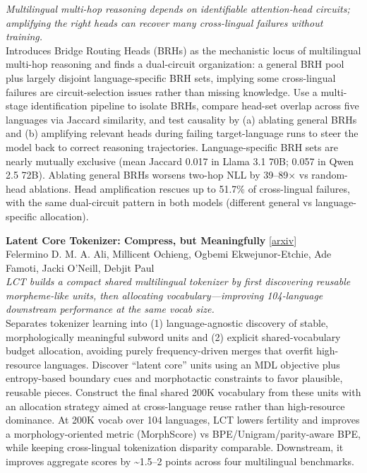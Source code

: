 \documentclass[12pt,letterpaper]{article}
\begin{document}
{\small\textit{Multilingual multi-hop reasoning depends on identifiable attention-head circuits; amplifying the right heads can recover many cross-lingual failures without training.}}\\[1pt]
{\footnotesize Introduces Bridge Routing Heads (BRHs) as the mechanistic locus of multilingual multi-hop reasoning and finds a dual-circuit organization: a general BRH pool plus largely disjoint language-specific BRH sets, implying some cross-lingual failures are circuit-selection issues rather than missing knowledge. Use a multi-stage identification pipeline to isolate BRHs, compare head-set overlap across five languages via Jaccard similarity, and test causality by (a) ablating general BRHs and (b) amplifying relevant heads during failing target-language runs to steer the model back to correct reasoning trajectories. Language-specific BRH sets are nearly mutually exclusive (mean Jaccard 0.017 in Llama 3.1 70B; 0.057 in Qwen 2.5 72B). Ablating general BRHs worsens two-hop NLL by 39--89× vs random-head ablations. Head amplification rescues up to 51.7\% of cross-lingual failures, with the same dual-circuit pattern in both models (different general vs language-specific allocation).}

\medskip

{\small\textbf{Latent Core Tokenizer: Compress, but Meaningfully}} {\scriptsize[\href{https://arxiv.org/abs/2610.12376}{arxiv}]}\\
{\scriptsize Felermino D. M. A. Ali, Millicent Ochieng, Ogbemi Ekwejunor-Etchie, Ade Famoti, Jacki O'Neill, Debjit Paul}\\

{\small\textit{LCT builds a compact shared multilingual tokenizer by first discovering reusable morpheme-like units, then allocating vocabulary---improving 104-language downstream performance at the same vocab size.}}\\[1pt]
{\footnotesize Separates tokenizer learning into (1) language-agnostic discovery of stable, morphologically meaningful subword units and (2) explicit shared-vocabulary budget allocation, avoiding purely frequency-driven merges that overfit high-resource languages. Discover ``latent core'' units using an MDL objective plus entropy-based boundary cues and morphotactic constraints to favor plausible, reusable pieces. Construct the final shared 200K vocabulary from these units with an allocation strategy aimed at cross-language reuse rather than high-resource dominance. At 200K vocab over 104 languages, LCT lowers fertility and improves a morphology-oriented metric (MorphScore) vs BPE/Unigram/parity-aware BPE, while keeping cross-lingual tokenization disparity comparable. Downstream, it improves aggregate scores by \textasciitilde{}1.5--2 points across four multilingual benchmarks.}
\end{document}
